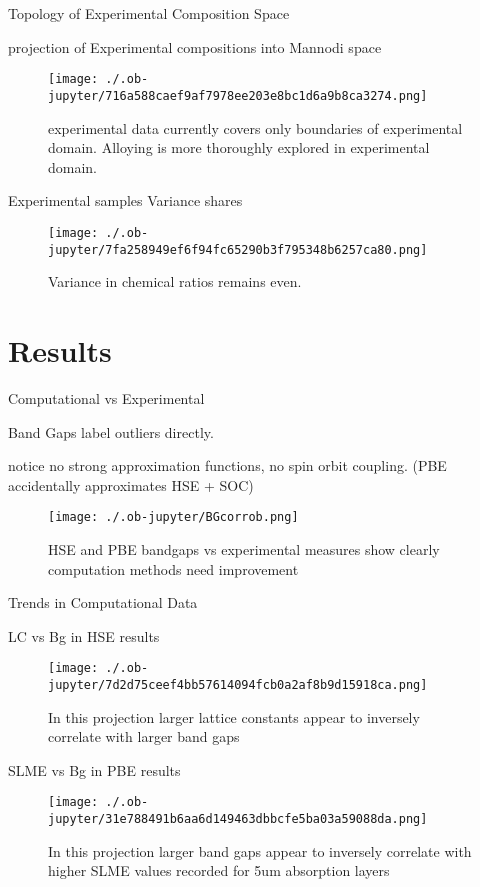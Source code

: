 \documentclass[8pt, compress]{beamer}
\begin{document}
\begin{frame}[allowframebreaks]{Topology of Experimental Composition Space}
\begin{block}{projection of Experimental compositions into Mannodi space}
\begin{figure}[htbp]
\centering
\texttt{[image: ./.ob-jupyter/716a588caef9af7978ee203e8bc1d6a9b8ca3274.png]}
\caption{experimental data currently covers only boundaries of experimental domain. Alloying is more thoroughly explored in experimental domain.}
\end{figure}
\end{block}
\begin{block}{Experimental samples Variance shares}
\begin{figure}[htbp]
\centering
\texttt{[image: ./.ob-jupyter/7fa258949ef6f94fc65290b3f795348b6257ca80.png]}
\caption{Variance in chemical ratios remains even.}
\end{figure}
\end{block}
\end{frame}
\section{Results}
\label{sec:org4e51dd4}
\begin{frame}[allowframebreaks]{Computational vs Experimental}
\begin{block}{Band Gaps}
label outliers directly.

notice no strong approximation functions, no spin orbit coupling. (PBE accidentally approximates HSE + SOC)


\begin{figure}[htbp]
\centering
\texttt{[image: ./.ob-jupyter/BGcorrob.png]}
\caption{\label{fig:bg_corr} HSE and PBE bandgaps vs experimental measures show clearly computation methods need improvement}
\end{figure}
\end{block}
\end{frame}
\begin{frame}[allowframebreaks]{Trends in Computational Data}
\begin{block}{LC vs Bg in HSE results}
\begin{figure}[htbp]
\centering
\texttt{[image: ./.ob-jupyter/7d2d75ceef4bb57614094fcb0a2af8b9d15918ca.png]}
\caption{\label{fig:HSE_clust} In this projection larger lattice constants appear to inversely correlate with larger band gaps}
\end{figure}
\end{block}
\begin{block}{SLME vs Bg in PBE results}
\begin{figure}[htbp]
\centering
\texttt{[image: ./.ob-jupyter/31e788491b6aa6d149463dbbcfe5ba03a59088da.png]}
\caption{\label{fig:PBE_clust} In this projection larger band gaps appear to inversely correlate with higher SLME values recorded for 5um absorption layers}
\end{figure}
\end{block}
\end{frame}
\end{document}

